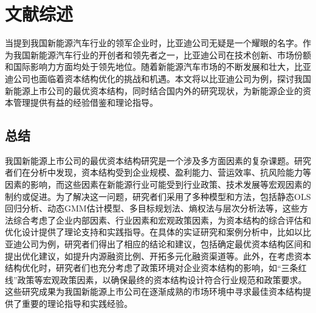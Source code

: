 \section{文献综述}
当提到我国新能源汽车行业的领军企业时，比亚迪公司无疑是一个耀眼的名字。作为我国新能源汽车行业的开创者和领先者之一，比亚迪公司在技术创新、市场份额和国际影响力方面均处于领先地位。随着新能源汽车市场的不断发展和壮大，比亚迪公司也面临着资本结构优化的挑战和机遇。本文将以比亚迪公司为例，探讨我国新能源上市公司的最优资本结构，同时结合国内外的研究现状，为新能源企业的资本管理提供有益的经验借鉴和理论指导。

\subsection{总结}
我国新能源上市公司的最优资本结构研究是一个涉及多方面因素的复杂课题。研究者们在分析中发现，资本结构受到企业规模、盈利能力、营运效率、抗风险能力等因素的影响，而这些因素在新能源行业可能受到行业政策、技术发展等宏观因素的制约或促进。为了解决这一问题，研究者们采用了多种模型和方法，包括静态OLS回归分析、动态GMM估计模型、多目标规划法、熵权法与层次分析法等，这些方法综合考虑了企业内部因素、行业因素和宏观政策因素，为资本结构的综合评估和优化设计提供了理论支持和实践指导。在具体的实证研究和案例分析中，比如以比亚迪公司为例，研究者们得出了相应的结论和建议，包括确定最优资本结构区间和提出优化建议，如提升内源融资比例、开拓多元化融资渠道等。此外，在考虑资本结构优化时，研究者们也充分考虑了政策环境对企业资本结构的影响，如“三条红线”政策等宏观政策因素，以确保最终的资本结构设计符合行业规范和政策要求。这些研究成果为我国新能源上市公司在逐渐成熟的市场环境中寻求最佳资本结构提供了重要的理论指导和实践经验。